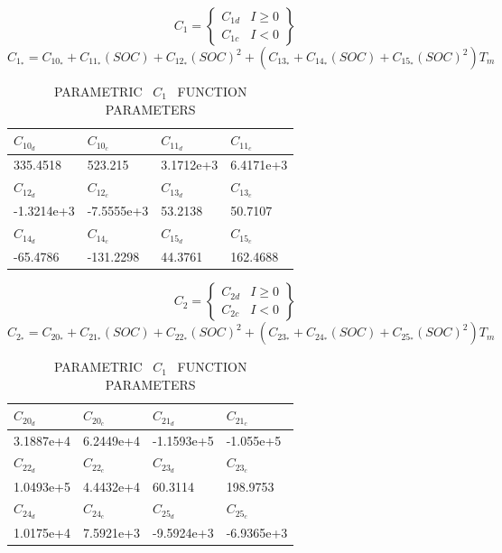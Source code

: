 \documentclass[12pt]{article}
\begin{document}
\begin{equation}
C_{1} = 
\begin{Bmatrix}
C_{1d}&I\ge 0 \\
C_{1c} &I<0
\end{Bmatrix}
\end{equation}
\begin{equation}
C_{1_{*}}=C_{10_{*}}+C_{11_{*}}(SOC)+C_{12_{*}}(SOC)^{2}+(C_{13_{*}}+C_{14_{*}}(SOC)+C_{15_{*}}(SOC)^{2}){T_m}
\end{equation}
\begin{table}[H]
	\caption{PARAMETRIC \ $C_1$ \  FUNCTION PARAMETERS}
	\vspace{-0.4cm}
	\centering
	\begin{tabular}{llll}
		\hline
		$C_{10_{d}}$ & $C_{10_{c}}$ & $C_{11_{d}}$ & $C_{11_{c}}$ \\
		\hline
		335.4518 & 523.215 & 3.1712e+3 & 6.4171e+3  \\
		\hline
		$C_{12_{d}}$ & $C_{12_{c}}$ & $C_{13_{d}}$ & $C_{13_{c}}$ \\
		\hline
		-1.3214e+3 & -7.5555e+3 & 53.2138 & 50.7107 \\
		\hline
		$C_{14_{d}}$ & $C_{14_{c}}$ & $C_{15_{d}}$ & $C_{15_{c}}$ \\
		\hline
		-65.4786 & -131.2298 & 44.3761 & 162.4688 \\
		\hline
	\end{tabular}
\end{table}
\begin{equation}
C_{2} = 
\begin{Bmatrix}
C_{2d}&I\ge 0  \\
C_{2c} &I<0
\end{Bmatrix}
\end{equation}
\begin{equation}
C_{2_{*}}=C_{20_{*}}+C_{21_{*}}(SOC)+C_{22_{*}}(SOC)^{2}+(C_{23_{*}}+C_{24_{*}}(SOC)+C_{25_{*}}(SOC)^{2}){T_m}
\end{equation}
\begin{table}[H]
	\caption{PARAMETRIC \ $C_1$ \ FUNCTION PARAMETERS}
	\vspace{-0.4cm}
	\centering
	\begin{tabular}{llll}
		\hline
		$C_{20_{d}}$ & $C_{20_{c}}$ & $C_{21_{d}}$ & $C_{21_{c}}$ \\
		\hline
		3.1887e+4 & 6.2449e+4 & -1.1593e+5 & -1.055e+5  \\
		\hline
		$C_{22_{d}}$ & $C_{22_{c}}$ & $C_{23_{d}}$ & $C_{23_{c}}$ \\
		\hline
		1.0493e+5 & 4.4432e+4 & 60.3114 & 198.9753 \\
		\hline
		$C_{24_{d}}$ & $C_{24_{c}}$ & $C_{25_{d}}$ & $C_{25_{c}}$ \\
		\hline
		1.0175e+4 & 7.5921e+3 & -9.5924e+3 & -6.9365e+3 \\
		\hline
	\end{tabular}
\end{table}
\end{document}
